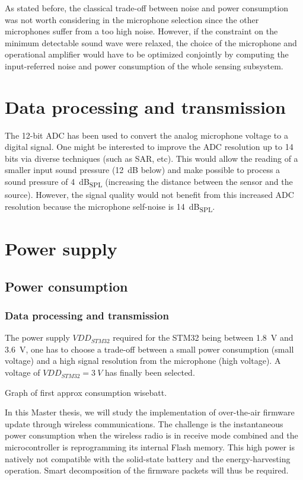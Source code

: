 \documentclass{EPL-master-thesis-covers-EN}
\begin{document}
As stated before, the classical trade-off between noise and power consumption was not worth considering in the microphone selection since the other microphones suffer from a too high noise. However, if the constraint on the minimum detectable sound wave were relaxed, the choice of the microphone and operational amplifier would have to be optimized conjointly by computing the input-referred noise and power consumption of the whole sensing subsystem.

\chapter{Data processing and transmission}



The 12-bit ADC has been used to convert the analog microphone voltage to a digital signal. One might be interested to improve the ADC resolution up to 14 bits via diverse techniques (such as SAR, etc). This would allow the reading of a smaller input sound pressure (\SI{12}{dB} below) and make possible to process a sound pressure of \SI{4}{dB_{SPL}} (increasing the distance between the sensor and the source). However, the signal quality would not benefit from this increased ADC resolution because the microphone self-noise is \SI{14}{dB_{SPL}}.
 

\chapter{Power supply}

\section{Power consumption}

\subsection*{Data processing and transmission}

The power supply $VDD_{STM32}$ required for the STM32 being between \SI{1.8}{V} and \SI{3.6}{V}, one has to choose a trade-off between a small power consumption (small voltage) and a high signal resolution from the microphone (high voltage). A voltage of $VDD_{STM32} = \SI{3}{V}$ has finally been selected.

Graph of first approx consumption wisebatt.

In this Master thesis, we will study the implementation of over-the-air firmware update through wireless communications. The challenge is the instantaneous power consumption when the wireless radio is in receive mode combined and the microcontroller is reprogramming its internal Flash memory. This high power is natively not compatible with the solid-state battery and the energy-harvesting operation. Smart decomposition of the firmware packets will thus be required.
\end{document}
